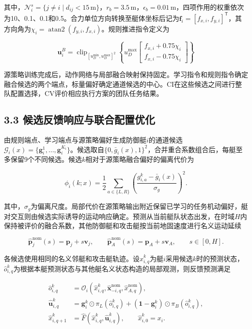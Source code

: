 \documentclass[UTF8,a4paper,zihao=5,fontset=none]{ctexart}
\begin{document}
其中，\(\mathcal N_i^s=\{j\ne i\mid d_{ij}<15\,\mathrm m\}\)，\(r_b=3.5\,\mathrm m\)，\(\epsilon_b=0.01\,\mathrm m\)，四项作用的权重依次为10、0.1、0.1和0.5。合力单位方向转换至艇体坐标后记为\(\boldsymbol f_i=[f_{x,i},f_{y,i}]^{\mathsf T}\)，其方向角为\(\chi_i=\operatorname{atan2}(f_{y,i},f_{x,i})\)。规则推进指令定义为

\[
\boldsymbol u_i^B=
\operatorname{clip}_{[u_D^{\min},u_D^{\max}]^2}
\left\{u_D^{\max}
\begin{bmatrix} f_{x,i}+0.75\chi_i\\ f_{x,i}-0.75\chi_i\end{bmatrix}\right\}
\tag{11}
\]

源策略训练完成后，动作网络与局部融合映射保持固定。学习指令和规则指令确定融合候选的两个端点，标量偏好确定通道候选的中心。CI在这些候选之间进行整队配置选择，CV评价相应执行方案的团队任务结果。

\subsection*{3.3 候选反馈响应与联合配置优化}

由规则端点、学习端点与源策略偏好生成防御艇\(i\)的通道候选\(\mathcal G_i(x)=\{\boldsymbol g_i^1,\ldots,\boldsymbol g_i^{K_i}\}\)。候选取自\(\{0,\bar g_i(x),1\}^2\)，合并重合系数组合后，每艇至多保留9个不同候选。候选\(k\)相对于源策略融合偏好的偏离代价为

\[
\phi_i(k;x)=\frac12\sum_{a\in\{L,R\}}
\left(\frac{g_{i,a}^{k}-\bar g_i(x)}{\sigma_g}\right)^2.
\tag{12}
\]

其中，\(\sigma_g\)为偏离尺度。局部代价在源策略输出附近保留已学习的任务机动偏好，艇对交互则由候选实际诱导的运动响应确定。预测从当前艇队状态出发，在时域\(H\)内保持被评价的融合系数，其他防御艇和攻击艇按当前地固速度进行名义运动延续

\[
\widehat{\boldsymbol p}^{\mathrm{nom}}_j(s)
=\boldsymbol p_j+s\boldsymbol v_j,
\qquad
\widehat{\boldsymbol p}^{\mathrm{nom}}_A(s)
=\boldsymbol p_A+s\boldsymbol v_A,
\qquad s\in[0,H].
\tag{13}
\]

各候选使用相同的名义邻艇和攻击艇轨迹。设\(\widehat x_{i,q}^{k}\)为艇\(i\)采用候选\(k\)时的预测状态，\(\widehat o_{i,q}^{k}\)为根据本艇预测状态与其他艇名义状态构造的局部观测，则反馈预测满足

\[
\begin{aligned}
\widehat o_{i,q}^{k}
&=\mathcal O_i\!\left(\widehat x_{i,q}^{k},
\widehat{\boldsymbol x}_{-i,q}^{\mathrm{nom}},\widehat x_{A,q}^{\mathrm{nom}}\right),\\
\widehat{\boldsymbol u}_{i,q}^{k}
&=\boldsymbol g_i^k\odot\pi_L(\widehat o_{i,q}^{k})
+(\boldsymbol1-\boldsymbol g_i^k)\odot\pi_B(\widehat o_{i,q}^{k}),\\
\widehat x_{i,q+1}^{k}
&=\widehat F\!\left(\widehat x_{i,q}^{k},\widehat{\boldsymbol u}_{i,q}^{k}\right),
\qquad \widehat x_{i,0}^{k}=x_i.
\end{aligned}
\tag{14}
\]
\end{document}

